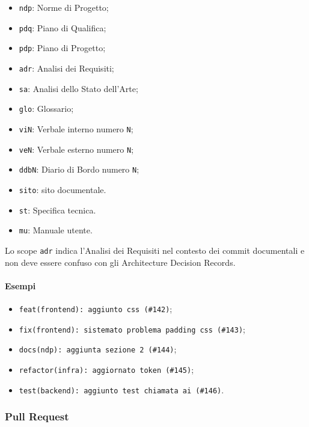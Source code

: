 \begin{itemize}
    \item \texttt{ndp}: Norme di Progetto;
    \item \texttt{pdq}: Piano di Qualifica;
    \item \texttt{pdp}: Piano di Progetto;
    \item \texttt{adr}: Analisi dei Requisiti;
    \item \texttt{sa}: Analisi dello Stato dell'Arte;
    \item \texttt{glo}: Glossario;
    \item \texttt{viN}: Verbale interno numero \texttt{N};
    \item \texttt{veN}: Verbale esterno numero \texttt{N};
    \item \texttt{ddbN}: Diario di Bordo numero \texttt{N};
    \item \texttt{sito}: sito documentale.
    \item \texttt{st}: Specifica tecnica.
    \item \texttt{mu}: Manuale utente.
\end{itemize}

Lo scope \texttt{adr} indica l'Analisi dei Requisiti nel contesto dei commit
documentali e non deve essere confuso con gli Architecture Decision Records.

\paragraph{Esempi}

\begin{itemize}
    \item \texttt{feat(frontend): aggiunto css (\#142)};
    \item \texttt{fix(frontend): sistemato problema padding css (\#143)};
    \item \texttt{docs(ndp): aggiunta sezione 2 (\#144)};
    \item \texttt{refactor(infra): aggiornato token (\#145)};
    \item \texttt{test(backend): aggiunto test chiamata ai (\#146)}.
\end{itemize}


\subsubsection{Pull Request}

